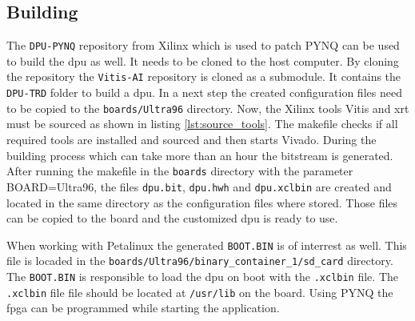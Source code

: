 \subsection{Building}
\label{subsec:embedded_platform:dpu:building}

The \texttt{DPU-PYNQ} repository from Xilinx which is used to patch PYNQ can be used to build the \acrshort{dpu} as well.
It needs to be cloned to the host computer.
By cloning the repository the \texttt{Vitis-AI} repository is cloned as a submodule.
It contains the \texttt{DPU-TRD} folder to build a \acrshort{dpu}.
In a next step the created configuration files need to be copied to the \texttt{boards/Ultra96} directory.
Now, the Xilinx tools Vitis and \acrshort{xrt} must be sourced as shown in listing \ref{lst:source_tools}.
The makefile checks if all required tools are installed and sourced and then starts Vivado.
During the building process which can take more than an hour the bitstream is generated. 
After running the makefile in the \texttt{boards} directory with the parameter BOARD=Ultra96, the files \texttt{dpu.bit}, \texttt{dpu.hwh} and \texttt{dpu.xclbin} are created and located in the same directory as the configuration files where stored.
Those files can be copied to the board and the customized \acrshort{dpu} is ready to use.

When working with Petalinux the generated \texttt{BOOT.BIN} is of interrest as well.
This file is locaded in the \texttt{boards/Ultra96/binary\_container\_1/sd\_card} directory.
The \texttt{BOOT.BIN} is responsible to load the \acrshort{dpu} on boot with the \texttt{.xclbin} file.
The \texttt{.xclbin} file file should be located at \texttt{/usr/lib} on the board.
Using PYNQ the \acrshort{fpga} can be programmed while starting the application.
